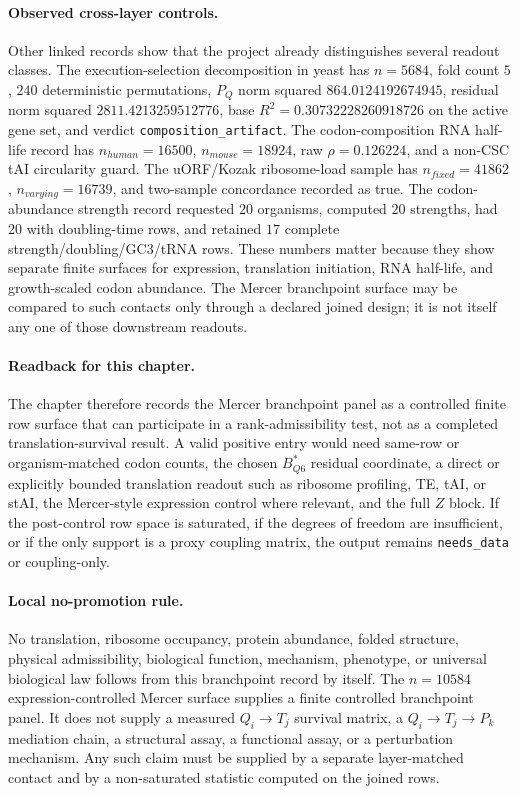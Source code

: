 \paragraph{Observed cross-layer controls.}
Other linked records show that the project already distinguishes several readout classes. The execution-selection decomposition in yeast has $n=5684$, fold count $5$, $240$ deterministic permutations, $P_Q$ norm squared $864.0124192674945$, residual norm squared $2811.4213259512776$, base $R^2=0.30732228260918726$ on the active gene set, and verdict \texttt{composition\_artifact}. The codon-composition RNA half-life record has $n_{human}=16500$, $n_{mouse}=18924$, raw $\rho=0.126224$, and a non-CSC tAI circularity guard. The uORF/Kozak ribosome-load sample has $n_{fixed}=41862$, $n_{varying}=16739$, and two-sample concordance recorded as true. The codon-abundance strength record requested $20$ organisms, computed $20$ strengths, had $20$ with doubling-time rows, and retained $17$ complete strength/doubling/GC3/tRNA rows. These numbers matter because they show separate finite surfaces for expression, translation initiation, RNA half-life, and growth-scaled codon abundance. The Mercer branchpoint surface may be compared to such contacts only through a declared joined design; it is not itself any one of those downstream readouts.

\paragraph{Readback for this chapter.}
The chapter therefore records the Mercer branchpoint panel as a controlled finite row surface that can participate in a rank-admissibility test, not as a completed translation-survival result. A valid positive entry would need same-row or organism-matched codon counts, the chosen $B^*_{Q6}$ residual coordinate, a direct or explicitly bounded translation readout such as ribosome profiling, TE, tAI, or stAI, the Mercer-style expression control where relevant, and the full $Z$ block. If the post-control row space is saturated, if the degrees of freedom are insufficient, or if the only support is a proxy coupling matrix, the output remains \texttt{needs\_data} or coupling-only.

\paragraph{Local no-promotion rule.}
No translation, ribosome occupancy, protein abundance, folded structure, physical admissibility, biological function, mechanism, phenotype, or universal biological law follows from this branchpoint record by itself. The $n=10584$ expression-controlled Mercer surface supplies a finite controlled branchpoint panel. It does not supply a measured $Q_i\to T_j$ survival matrix, a $Q_i\to T_j\to P_k$ mediation chain, a structural assay, a functional assay, or a perturbation mechanism. Any such claim must be supplied by a separate layer-matched contact and by a non-saturated statistic computed on the joined rows.